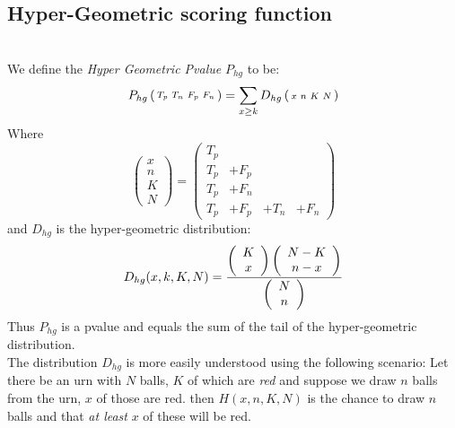 \documentclass{amsart}
\theoremstyle{definition}
\theoremstyle{remark}
\theoremstyle{definition}
\theoremstyle{remark}
\begin{document}
\subsection{Hyper-Geometric scoring function} \mbox {} \\
We define the \emph{Hyper Geometric Pvalue} $P_{hg}$ to be:
\begin{equation}
	P_{hg}\left(\begin{smallmatrix} T_p & T_n & F_p & F_n \end{smallmatrix}\right) = \sum_{x \geq k} D_{hg} \left(\begin{smallmatrix} x & n & K & N \end{smallmatrix}\right)
\end{equation}		
Where \begin{equation}
			\left(\begin{smallmatrix} x \\ n \\ K \\ N \end{smallmatrix}\right) = 
			\left(\begin{smallmatrix} 	T_p & & & \\ 
												T_p & + F_p & & \\ 
												T_p & + F_n & & \\ 
												T_p & + F_p & + T_n & + F_n 
					\end{smallmatrix}\right) 
		\end{equation} 
and $D_{hg}$ is the hyper-geometric distribution:
\begin{equation}
D_{hg}(x, k, K, N) = 
\frac{%
	\left( \begin{array}{c} K \\ x \end{array} \right)%
	\left( \begin{array}{c} N-K \\ n-x \end{array} \right)%
}{%
	\left( \begin{array}{c} N \\ n \end{array} \right)%
}
\end{equation}		
Thus $P_{hg}$ is a pvalue and equals the sum of the tail of the hyper-geometric distribution. \\
The distribution $D_{hg}$ is more easily understood using the following scenario:
Let there be an urn with $N$ balls, $K$ of which are \emph{red}
and suppose we draw $n$ balls from the urn, $x$ of those are red.
then $H(x, n, K, N)$ is the chance to draw $n$ balls and that
\emph{at least} $x$ of these will be red.
\end{document}

